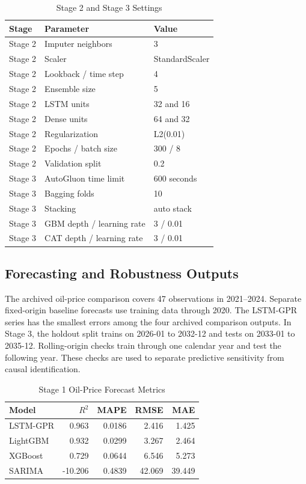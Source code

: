 \begin{table}[!ht]
\centering
\caption{Stage 2 and Stage 3 Settings}
\label{tab:appendix-stage23-settings}
\scriptsize
\begin{tabular}{P{0.16\columnwidth}P{0.43\columnwidth}P{0.25\columnwidth}}
\toprule
\textbf{Stage} & \textbf{Parameter} & \textbf{Value} \\
\midrule
Stage 2 & Imputer neighbors & 3 \\
Stage 2 & Scaler & StandardScaler \\
Stage 2 & Lookback / time step & 4 \\
Stage 2 & Ensemble size & 5 \\
Stage 2 & LSTM units & 32 and 16 \\
Stage 2 & Dense units & 64 and 32 \\
Stage 2 & Regularization & L2(0.01) \\
Stage 2 & Epochs / batch size & 300 / 8 \\
Stage 2 & Validation split & 0.2 \\
Stage 3 & AutoGluon time limit & 600 seconds \\
Stage 3 & Bagging folds & 10 \\
Stage 3 & Stacking & auto stack \\
Stage 3 & GBM depth / learning rate & 3 / 0.01 \\
Stage 3 & CAT depth / learning rate & 3 / 0.01 \\
\bottomrule
\end{tabular}
\end{table}

\subsection{Forecasting and Robustness Outputs}

The archived oil-price comparison covers 47 observations in 2021--2024. Separate fixed-origin baseline forecasts use training data through 2020. The LSTM-GPR series has the smallest errors among the four archived comparison outputs. In Stage 3, the holdout split trains on 2026-01 to 2032-12 and tests on 2033-01 to 2035-12. Rolling-origin checks train through one calendar year and test the following year. These checks are used to separate predictive sensitivity from causal identification.

\begin{table}[!ht]
\centering
\caption{Stage 1 Oil-Price Forecast Metrics}
\label{tab:appendix-stage1-metrics}
\scriptsize
\begin{tabular}{lrrrr}
\toprule
\textbf{Model} & \textbf{$R^2$} & \textbf{MAPE} & \textbf{RMSE} & \textbf{MAE} \\
\midrule
LSTM-GPR & 0.963 & 0.0186 & 2.416 & 1.425 \\
LightGBM & 0.932 & 0.0299 & 3.267 & 2.464 \\
XGBoost & 0.729 & 0.0644 & 6.546 & 5.273 \\
SARIMA & -10.206 & 0.4839 & 42.069 & 39.449 \\
\bottomrule
\end{tabular}
\end{table}

